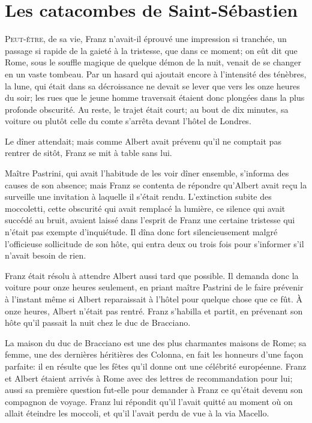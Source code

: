 \chapter{Les catacombes de Saint-Sébastien}

\lettrine{P}{eut-être,} de sa vie, Franz n'avait-il éprouvé une impression si tranchée, un passage si rapide de la gaieté à la tristesse, que dans ce moment; on eût dit que Rome, sous le souffle magique de quelque démon de la nuit, venait de se changer en un vaste tombeau. Par un hasard qui ajoutait encore à l'intensité des ténèbres, la lune, qui était dans sa décroissance ne devait se lever que vers les onze heures du soir; les rues que le jeune homme traversait étaient donc plongées dans la plus profonde obscurité. Au reste, le trajet était court; au bout de dix minutes, sa voiture ou plutôt celle du comte s'arrêta devant l'hôtel de Londres. 

Le dîner attendait; mais comme Albert avait prévenu qu'il ne comptait pas rentrer de sitôt, Franz se mit à table sans lui. 

Maître Pastrini, qui avait l'habitude de les voir dîner ensemble, s'informa des causes de son absence; mais Franz se contenta de répondre qu'Albert avait reçu la surveille une invitation à laquelle il s'était rendu. L'extinction subite des moccoletti, cette obscurité qui avait remplacé la lumière, ce silence qui avait succédé au bruit, avaient laissé dans l'esprit de Franz une certaine tristesse qui n'était pas exempte d'inquiétude. Il dîna donc fort silencieusement malgré l'officieuse sollicitude de son hôte, qui entra deux ou trois fois pour s'informer s'il n'avait besoin de rien. 

Franz était résolu à attendre Albert aussi tard que possible. Il demanda donc la voiture pour onze heures seulement, en priant maître Pastrini de le faire prévenir à l'instant même si Albert reparaissait à l'hôtel pour quelque chose que ce fût. À onze heures, Albert n'était pas rentré. Franz s'habilla et partit, en prévenant son hôte qu'il passait la nuit chez le duc de Bracciano. 

La maison du duc de Bracciano est une des plus charmantes maisons de Rome; sa femme, une des dernières héritières des Colonna, en fait les honneurs d'une façon parfaite: il en résulte que les fêtes qu'il donne ont une célébrité européenne. Franz et Albert étaient arrivés à Rome avec des lettres de recommandation pour lui; aussi sa première question fut-elle pour demander à Franz ce qu'était devenu son compagnon de voyage. Franz lui répondit qu'il l'avait quitté au moment où on allait éteindre les moccoli, et qu'il l'avait perdu de vue à la via Macello. 

